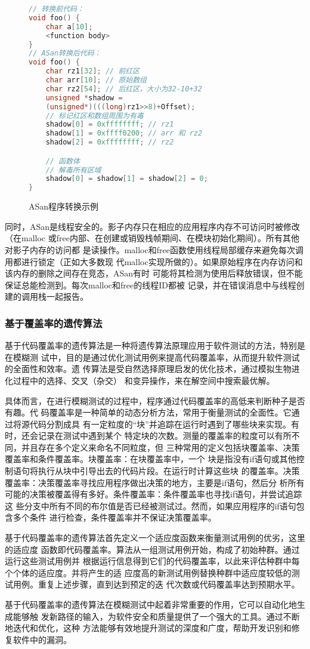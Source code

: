 \begin{figure}[H]
\begin{lstlisting}[language=C++]
// 转换前代码：
void foo() {
	char a[10];
	<function body>
}
// ASan转换后代码：
void foo() {
	char rz1[32]; // 前红区
	char arr[10]; // 原始数组
	char rz2[54]; // 后红区，大小为32-10+32
	unsigned *shadow =
	(unsigned*)(((long)rz1>>8)+Offset);
	// 标记红区和数组周围为有毒
	shadow[0] = 0xffffffff; // rz1
	shadow[1] = 0xffff0200; // arr 和 rz2
	shadow[2] = 0xffffffff; // rz2

	// 函数体
	// 解毒所有区域
	shadow[0] = shadow[1] = shadow[2] = 0;
}
\end{lstlisting}
\label{lst:asanfoo}
\caption{ASan程序转换示例}
\end{figure}

同时，ASan是线程安全的。影子内存只在相应的应用程序内存不可访问时被修改（在malloc
或free内部、在创建或销毁栈帧期间、在模块初始化期间）。所有其他对影子内存的访问都
是读操作。malloc和free函数使用线程局部缓存来避免每次调用都进行锁定（正如大多数现
代malloc实现所做的）。如果原始程序在内存访问和该内存的删除之间存在竞态，ASan有时
可能将其检测为使用后释放错误，但不能保证总能检测到。每次malloc和free的线程ID都被
记录，并在错误消息中与线程创建的调用栈一起报告。

\subsubsection{基于覆盖率的遗传算法}

基于代码覆盖率的遗传算法是一种将遗传算法原理应用于软件测试的方法，特别是在模糊测
试中，目的是通过优化测试用例来提高代码覆盖率，从而提升软件测试的全面性和效率。遗
传算法是受自然选择原理启发的优化技术，通过模拟生物进化过程中的选择、交叉（杂交）
和变异操作，来在解空间中搜索最优解。

具体而言，在进行模糊测试的过程中，程序通过代码覆盖率的高低来判断种子是否有趣。代
码覆盖率是一种简单的动态分析方法，常用于衡量测试的全面性。它通过将源代码分割成具
有一定粒度的“块”并追踪在运行时遇到了哪些块来实现。有时，还会记录在测试中遇到某个
特定块的次数。测量的覆盖率的粒度可以有所不同，并且存在多个定义来命名不同粒度，但
三种常用的定义包括块覆盖率、决策覆盖率和条件覆盖率。块覆盖率：在块覆盖率中，一个
块是指没有if语句或其他控制语句将执行从块中引导出去的代码片段。在运行时计算这些块
的覆盖率。决策覆盖率：决策覆盖率寻找应用程序做出决策的地方，主要是if语句，然后分
析所有可能的决策被覆盖得有多好。条件覆盖率：条件覆盖率也寻找if语句，并尝试追踪这
些分支中所有不同的布尔值是否已经被测试过。然而，如果应用程序的if语句包含多个条件
进行检查，条件覆盖率并不保证决策覆盖率。

基于代码覆盖率的遗传算法首先定义一个适应度函数来衡量测试用例的优劣，这里的适应度
函数即代码覆盖率。算法从一组测试用例开始，构成了初始种群。通过运行这些测试用例并
根据运行信息得到它们的代码覆盖率，以此来评估种群中每个个体的适应度。并将产生的适
应度高的新测试用例替换种群中适应度较低的测试用例。重复上述步骤，直到达到预定的迭
代次数或代码覆盖率达到预期水平。

基于代码覆盖率的遗传算法在模糊测试中起着非常重要的作用，它可以自动化地生成能够触
发新路径的输入，为软件安全和质量提供了一个强大的工具。通过不断地迭代和优化，这种
方法能够有效地提升测试的深度和广度，帮助开发识别和修复软件中的漏洞。

